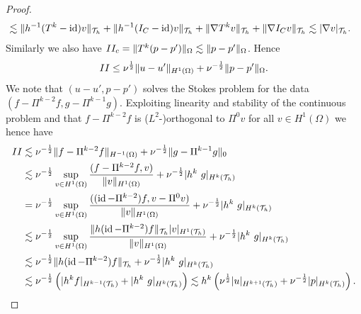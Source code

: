 \documentclass[sn-mathphys,Numbered]{sn-jnl}%
\theoremstyle{remark}%
\theoremstyle{definition}%
\begin{document}
\begin{proof}
\begin{align*}
 &\lesssim  \Vert  h^{-1}(T^k - \operatorname{id}) v \Vert_{{\mathcal{T}_h}} + \Vert h^{-1} (I_C - \operatorname{id}) v \Vert_{{\mathcal{T}_h}}
 + \Vert \nabla T^k v  \Vert_{{\mathcal{T}_h}} + \Vert \nabla I_C v  \Vert_{{\mathcal{T}_h}} \lesssim  \vert  \nabla v \vert_{{\mathcal{T}_h}}.
 \end{align*}
Similarly we also have
 $II_c  =  \Vert  T^k (p-p') \Vert_{\Omega} \lesssim \Vert  p-p' \Vert_{\Omega}$. Hence 
 $$II \leq \nu^{\frac12}  \Vert  u-u' \Vert_{H^1(\Omega)} + \nu^{-\frac12} \Vert  p-p' \Vert_{\Omega}.$$ 
 We note that 
$(u-u', p-p')$ solves the Stokes problem for the data $(f- \Pi^{k-2}f,g-\Pi^{k-1}g)$. 
Exploiting linearity and stability of the continuous problem and that $f- \Pi^{k-2}f$ is ($L^2$-)orthogonal to $\Pi^0 v$ for all $v \in H^1(\Omega)$ we hence have
\begin{align*}
  II & \lesssim \nu^{-\frac12} \Vert f - \Pi^{k-2} f \Vert_{H^{-1}(\Omega)} + \nu^{-\frac12} \Vert g - \Pi^{k-1} g \Vert_{0} \\
  & \lesssim \nu^{-\frac12} \sup_{v \in H^1(\Omega)} \frac{ (f - \Pi^{k-2} f,v)}{\Vert v \Vert_{H^{1}(\Omega)}} + \nu^{-\frac12} \vert h^k \ g \vert_{H^k({\mathcal{T}_h})} \\
  & = \nu^{-\frac12} \sup_{v \in H^1(\Omega)} \frac{ ((\operatorname{id} - \Pi^{k-2}) f,v - \Pi^0 v)}{\Vert v \Vert_{H^{1}(\Omega)}} + \nu^{-\frac12} \vert h^k \ g \vert_{H^k({\mathcal{T}_h})} \\
  & \lesssim \nu^{-\frac12} \sup_{v \in H^1(\Omega)} \frac{\Vert h(\operatorname{id} - \Pi^{k-2}) f \Vert_{{\mathcal{T}_h}} \vert  v \vert_{H^1({\mathcal{T}_h})}}{\Vert v \Vert_{H^{1}(\Omega)}} + \nu^{-\frac12} \vert h^k\ g \vert_{H^k({\mathcal{T}_h})} \\
  &   \lesssim \nu^{-\frac12} \Vert h (\operatorname{id} - \Pi^{k-2}) f \Vert_{{\mathcal{T}_h}} + \nu^{-\frac12} \vert h^k \ g \vert_{H^k({\mathcal{T}_h})}
  \\
  & \lesssim \nu^{-\frac12} \left( \vert h^k f \vert_{H^{k-1}({\mathcal{T}_h})} + \vert h^k \ g \vert_{H^k({\mathcal{T}_h})} \right)
    \lesssim h^k \left( \nu^{\frac12} \vert u \vert_{H^{k+1}({\mathcal{T}_h})} + \nu^{-\frac12}  \vert p \vert_{H^k({\mathcal{T}_h})} \right).
\end{align*}


\end{proof}
\end{document}
